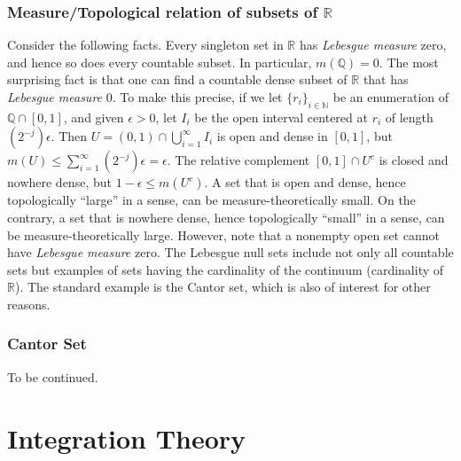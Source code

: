 \documentclass{article}
\begin{document}
\subsubsection{Measure/Topological relation of subsets of $\mathbb{R}$}
Consider the following facts. Every singleton set in $\mathbb{R}$ has \emph{Lebesgue measure} zero, and hence so does every countable subset. In particular, $m(\mathbb{Q})=0$. The most surprising fact is that one can find a countable dense subset of $\mathbb{R}$ that has \emph{Lebesgue measure} 0. \newline \newline 
To make this precise, if we let $\{r_i\}_{i\in\mathbb{N}}$ be an enumeration of $\mathbb{Q}\cap[0,1]$, and given $\epsilon>0$, let $I_i$ be the open interval centered at $r_i$ of length $(2^{-j})\epsilon$. Then $U=(0,1)\cap\bigcup_{i=1}^{\infty}I_i$ is open and dense in $[0,1]$, but $m(U) \leq \sum_{i=1}^{\infty}(2^{-j})\epsilon=\epsilon$. The relative complement $[0,1]\cap U^c$ is closed and nowhere dense, but $1-\epsilon\leq m(U^c)$. A set that is open and dense, hence topologically ``large'' in a sense, can be measure-theoretically small. On the contrary, a set that is nowhere dense, hence  topologically ``small'' in a sense, can be measure-theoretically large. However, note that a nonempty open set cannot have \emph{Lebesgue measure} zero. \newline \newline 
The Lebesgue null sets include not only all countable sets but examples of sets having the cardinality of the continuum (cardinality of $\mathbb{R}$). The standard example is the Cantor set, which is also of interest for other reasons.

\subsubsection{Cantor Set}
To be continued. \newline \newline 

\section{Integration Theory}
\end{document}
